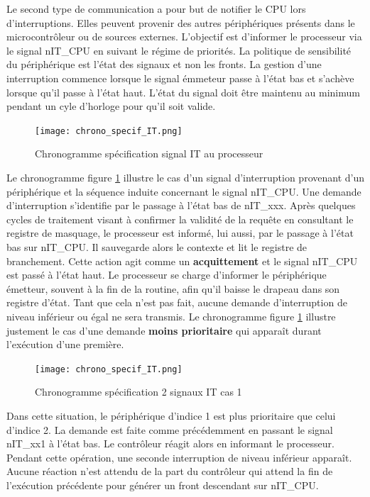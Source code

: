 \gap
Le second type de communication a pour but de notifier le \gls{CPU} lors d'interruptions.
Elles peuvent provenir des autres périphériques présents dans le microcontrôleur ou de sources externes.
L'objectif est d'informer le processeur via le signal nIT\_CPU en suivant le régime de priorités.
La politique de sensibilité du périphérique est l'état des signaux et non les fronts.
La gestion d'une interruption commence lorsque le signal émmeteur passe à l'état bas et s'achève lorsque  qu'il passe à l'état haut. 
L'état du signal doit être maintenu au minimum pendant un cyle d'horloge pour qu'il soit valide. %
\begin{figure}[H]
	\centering
	\texttt{[image: chrono\_specif\_IT.png]}
	\caption{Chronogramme spécification signal IT au processeur}
	\label{fig:spe_IT}
\end{figure}
Le chronogramme figure \ref{fig:spe_IT} illustre le cas d'un signal d'interruption provenant d'un périphérique et la séquence induite concernant le signal nIT\_CPU.
Une demande d'interruption s'identifie par le passage à l'état bas de nIT\_xxx. 
Après quelques cycles de traitement visant à confirmer la validité de la requête en consultant le registre de masquage, le processeur est informé, lui aussi, par le passage à l'état bas sur nIT\_CPU.
Il sauvegarde alors le contexte et lit le registre de branchement.
Cette action agit comme un \textbf{acquittement} et le signal nIT\_CPU est passé à l'état haut.
Le processeur se charge d'informer le périphérique émetteur, souvent à la fin de la routine, afin qu'il baisse le drapeau dans son registre d'état.
Tant que cela n'est pas fait, aucune demande d'interruption de niveau inférieur ou égal ne sera transmis.
Le chronogramme figure \ref{fig:spe_IT} illustre justement le cas d'une demande \textbf{moins prioritaire} qui apparaît durant l'exécution d'une première.
\begin{figure}[H]
	\centering
	\texttt{[image: chrono\_specif\_IT.png]}
	\caption{Chronogramme spécification 2 signaux IT cas 1}
	\label{fig:spe_IT_cas1}
\end{figure}
Dans cette situation, le périphérique d'indice 1 est plus prioritaire que celui d'indice 2. 
La demande est faite comme précédemment en passant le signal nIT\_xx1 à l'état bas.
Le contrôleur réagit alors en informant le processeur.
Pendant cette opération, une seconde interruption de niveau inférieur apparaît.
Aucune réaction n'est attendu de la part du contrôleur qui attend la fin de l'exécution précédente pour générer un front descendant sur nIT\_CPU.
